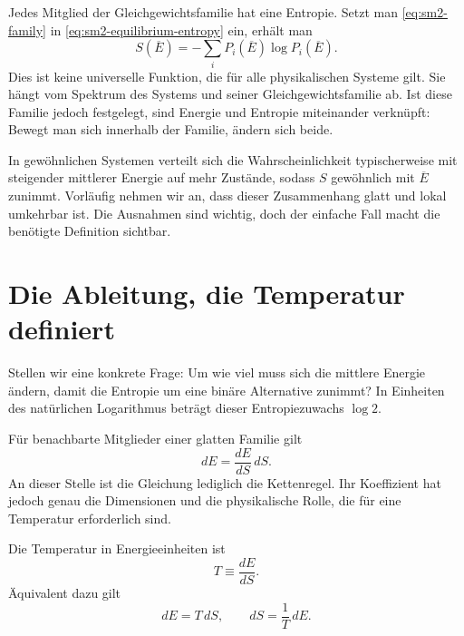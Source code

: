 Jedes Mitglied der Gleichgewichtsfamilie hat eine Entropie. Setzt man \eqref{eq:sm2-family} in \eqref{eq:sm2-equilibrium-entropy} ein, erhält man
\begin{equation}
 S(\overline E)
 =-\sum_iP_i(\overline E)\log P_i(\overline E).
 \label{eq:sm2-entropy-energy}
\end{equation}
Dies ist keine universelle Funktion, die für alle physikalischen Systeme gilt. Sie hängt vom Spektrum des Systems und seiner Gleichgewichtsfamilie ab. Ist diese Familie jedoch festgelegt, sind Energie und Entropie miteinander verknüpft: Bewegt man sich innerhalb der Familie, ändern sich beide.

In gewöhnlichen Systemen verteilt sich die Wahrscheinlichkeit typischerweise mit steigender mittlerer Energie auf mehr Zustände, sodass \(S\) gewöhnlich mit \(\overline E\) zunimmt. Vorläufig nehmen wir an, dass dieser Zusammenhang glatt und lokal umkehrbar ist. Die Ausnahmen sind wichtig, doch der einfache Fall macht die benötigte Definition sichtbar.

\section{Die Ableitung, die Temperatur definiert}

Stellen wir eine konkrete Frage: Um wie viel muss sich die mittlere Energie ändern, damit die Entropie um eine binäre Alternative zunimmt? In Einheiten des natürlichen Logarithmus beträgt dieser Entropiezuwachs \(\log2\).

Für benachbarte Mitglieder einer glatten Familie gilt
\begin{equation}
 dE=\frac{dE}{dS}\,dS.
 \label{eq:sm2-differential-identity}
\end{equation}
An dieser Stelle ist die Gleichung lediglich die Kettenregel. Ihr Koeffizient hat jedoch genau die Dimensionen und die physikalische Rolle, die für eine Temperatur erforderlich sind.

\begin{definition}
Die Temperatur in Energieeinheiten ist
\begin{equation}
 T\equiv\frac{dE}{dS}.
 \label{eq:sm2-temperature-definition}
\end{equation}
Äquivalent dazu gilt
\begin{equation}
 dE=T\,dS,
 \qquad
 dS=\frac{1}{T}\,dE.
 \label{eq:sm2-fundamental-differentials}
\end{equation}
\end{definition}


